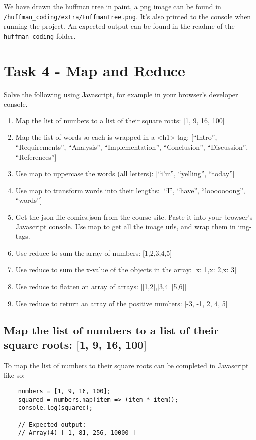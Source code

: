 \documentclass{article}
\begin{document}
We have drawn the huffman tree in paint, a png image can be found in \verb|/huffman_coding/extra/HuffmanTree.png|.
It's also printed to the console when running the project. An expected output can be found in the readme of the \verb|huffman_coding| folder.

\section{Task 4 - Map and Reduce}
Solve the following using Javascript, for example in your browser’s developer console.
\begin{enumerate}
    \item Map the list of numbers to a list of their square roots: [1, 9, 16, 100]
    \item Map the list of words so each is wrapped in a <h1> tag: [“Intro”, “Requirements”, “Analysis”, “Implementation”, “Conclusion”, “Discussion”, “References”]
    \item Use map to uppercase the words (all letters): [“i’m”, “yelling”, “today”]
    \item Use map to transform words into their lengths: [“I”, “have”, “looooooong”, “words”]
    \item Get the json file comics.json from the course site. Paste it into your browser’s Javascript console. Use map to get all the image urls, and wrap them in img-tags.
    \item Use reduce to sum the array of numbers: [1,2,3,4,5]
    \item Use reduce to sum the x-value of the objects in the array: [{x: 1},{x: 2},{x: 3}]
    \item Use reduce to flatten an array of arrays: [[1,2],[3,4],[5,6]]
    \item Use reduce to return an array of the positive numbers: [-3, -1, 2, 4, 5]
\end{enumerate}

\subsection{Map the list of numbers to a list of their square roots: [1, 9, 16, 100]}
\lstset{language=Java}
To map the list of numbers to their square roots can be completed in Javascript like so:
\begin{lstlisting}
    numbers = [1, 9, 16, 100];
    squared = numbers.map(item => (item * item));
    console.log(squared);

    // Expected output:
    // Array(4) [ 1, 81, 256, 10000 ]

\end{lstlisting}
\end{document}
